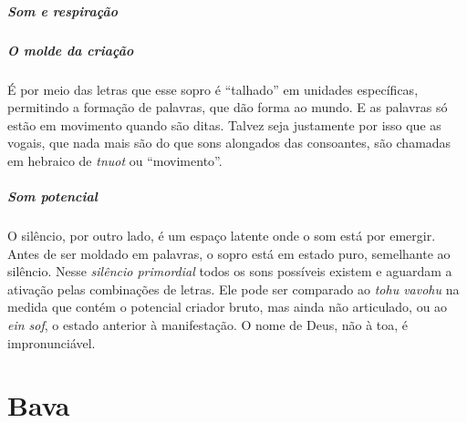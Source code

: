 \paragraph{Som e respiração} 

\paragraph{O molde da criação} É por meio das letras que esse sopro é ``talhado'' em unidades específicas, permitindo a formação de palavras, que dão forma ao mundo. E as palavras só estão em movimento quando são ditas. Talvez seja justamente por isso que as vogais, que nada mais são do que sons alongados das consoantes, são chamadas em hebraico de \textit{tnuot} ou ``movimento''.

\paragraph{Som potencial} O silêncio, por outro lado, é um espaço latente onde o som está por emergir. Antes de ser moldado em palavras, o sopro está em estado puro, semelhante ao silêncio. Nesse \textit{silêncio primordial} todos os sons possíveis existem e aguardam a ativação pelas combinações de letras. Ele pode ser comparado ao \textit{tohu vavohu} na medida que contém o potencial criador bruto, mas ainda não articulado, ou ao \textit{ein sof}, o estado anterior à manifestação. O nome de Deus, não à toa, é impronunciável.

\chapter*{Bava \smallskip{}}

\begin{center}
{\huge{}}
\end{center}

